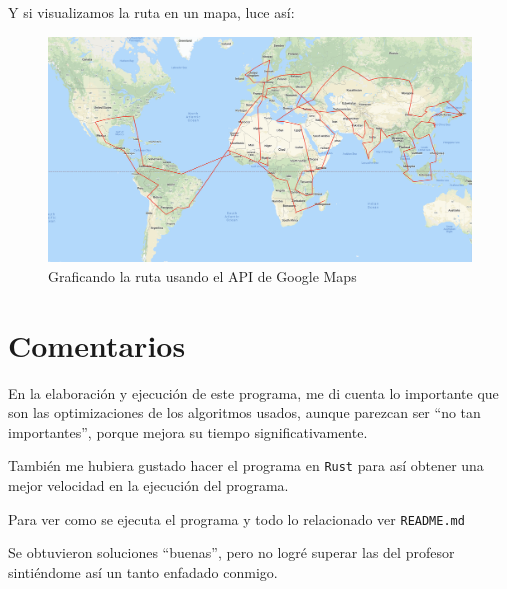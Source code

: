 \documentclass{article}
\begin{document}
Y si visualizamos la ruta en un mapa, luce así:
\begin{figure}[H]
  \centering
  \includegraphics[width=\textwidth,height=\textheight,keepaspectratio]{assets/img/tsp_best_150.png}
  \caption{Graficando la ruta usando el API de Google Maps}
\end{figure}


\section{Comentarios}
En la elaboración y ejecución de este programa, me di cuenta lo importante que son las optimizaciones
de los algoritmos usados, aunque parezcan ser ``no tan importantes'', porque mejora su
tiempo significativamente.

También me hubiera gustado hacer el programa en \texttt{Rust} para así obtener una mejor
velocidad en la ejecución del programa.

Para ver como se ejecuta el programa y todo lo relacionado ver \texttt{README.md}

Se obtuvieron soluciones ``buenas'', pero no logré superar las del profesor sintiéndome así un tanto
enfadado conmigo.


\nocite{*}
  
 
\end{document}
